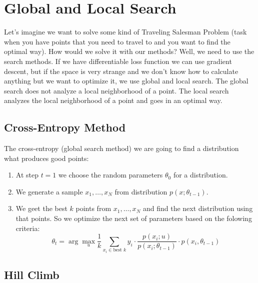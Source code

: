 \chapter{Global and Local Search}

{\sf Let's imagine we want to solve some kind of Traveling Salesman Problem (task when you have points that you need to travel to and you want to find the optimal way). How would we solve it with our methods? Well, we need to use the search methods. If we have differentiable loss function we can use gradient descent, but if the space is very strange and we don't know how to calculate anything but we want to optimize it, we use global and local search. The global search does not analyze a local neighborhood of a point. The local search analyzes the local neighborhood of a point and goes in an optimal way.}

\section{Cross-Entropy Method}

The cross-entropy (global search method) we are going to find a distribution what produces good points:
\begin{enumerate}
	\item At step $t=1$ we choose the random parameters $\theta_0$ for a distribution.
	\item We generate a sample $x_1,\ldots,x_N$ from distribution $p(x;\theta_{t-1})$.
	\item We geet the best $k$ points from $x_1,\ldots,x_N$ and find the next distribution using that points. So we optimize the next set of parameters based on the folowing criteria:
	$$\theta_t=\arg\max\limits_{u}\frac{1}{k}\sum\limits_{x_i\in \text{best }k}y_i\cdot\frac{p(x_i;u)}{p(x_i;\theta_{t-1})}\cdot p(x_i, \theta_{t-1})$$
\end{enumerate}

\section{Hill Climb}

